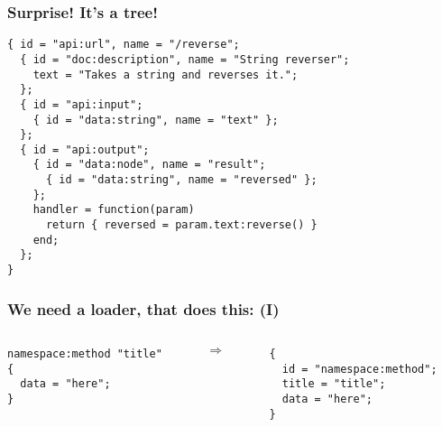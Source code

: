 \documentclass[handout]{beamer}
\begin{document}

\begin{frame}[fragile]

\frametitle{Surprise! It's a tree!}

\begin{verbatim}
{ id = "api:url", name = "/reverse";
  { id = "doc:description", name = "String reverser";
    text = "Takes a string and reverses it.";
  };
  { id = "api:input";
    { id = "data:string", name = "text" };
  };
  { id = "api:output";
    { id = "data:node", name = "result";
      { id = "data:string", name = "reversed" };
    };
    handler = function(param)
      return { reversed = param.text:reverse() }
    end;
  };
}
\end{verbatim}

\end{frame}


\begin{frame}[fragile]

\frametitle{We need a loader, that does this: (I)}

\begin{columns}

\begin{column}{0.5\textwidth}
\begin{verbatim}
namespace:method "title"
{
  data = "here";
}
\end{verbatim}
\end{column}

\begin{column}{0.05\textwidth}
$\Rightarrow$
\end{column}

\begin{column}{0.5\textwidth}
\begin{verbatim}
{
  id = "namespace:method";
  title = "title";
  data = "here";
}
\end{verbatim}
\end{column}

\end{columns}
\end{frame}

\end{document}
